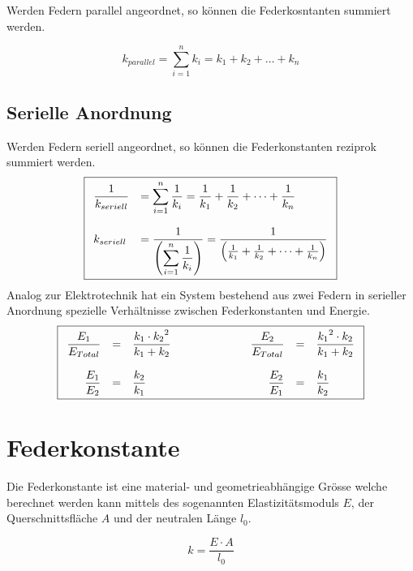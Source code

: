 \noindent
Werden Federn parallel angeordnet, so können die Federkosntanten summiert 
werden.

\[ \boxed{k_{parallel} 
	= \sum_{i=1}^n k_i 
	= k_1 + k_2 + \dots + k_n
} \]

\subsection{Serielle Anordnung}

\noindent
Werden Federn seriell angeordnet, so können die Federkonstanten reziprok 
summiert werden.
\[ \boxed{\begin{array}{l l}\displaystyle
	\frac{1}{k_{seriell}} 
		&= \displaystyle \sum_{i=1}^n \frac{1}{k_i} = 
		\displaystyle \frac{1}{k_1} + \frac{1}{k_2} 
			+ \dots + \frac{1}{k_n} \\
	& \\
	k_{seriell} 
		&= \displaystyle \frac{1}{\left( 
			\displaystyle \sum_{i=1}^n\frac{1}{k_i}\right)} 
		= \displaystyle \frac{1}{\left(
			\frac{1}{k_1} + \frac{1}{k_2} 
			+ \dots + \frac{1}{k_n} \right)}
\end{array}} \]
Analog zur Elektrotechnik hat ein System bestehend aus zwei Federn
in serieller Anordnung spezielle Verhältnisse zwischen Federkonstanten 
und Energie.
\[ \boxed{\begin{array}{r c l  r c l}
\displaystyle
\frac{E_1}{E_{Total}} 
	&=& \displaystyle \frac{k_1 \cdot {k_2}^2}{k_1 + k_2} 
	\qquad \qquad
	& \qquad \displaystyle \frac{E_2}{E_{Total}}
	&=& \displaystyle \frac{{k_1}^2 \cdot k_2}{k_1 + k_2} \\
 & & & & & \\
\displaystyle \frac{E_1}{E_2} 
	&=& \displaystyle \frac{k_2}{k_1} 
	\qquad \qquad
	& \qquad \displaystyle \frac{E_2}{E_1} 
	&=& 
	\displaystyle \frac{k_1}{k_2}
\end{array}} \]
\section{Federkonstante}
Die Federkonstante ist eine material- und geometrieabhängige Grösse welche
berechnet werden kann mittels des sogenannten Elastizitätsmoduls $E$, der
Querschnittsfläche $A$ und der neutralen Länge $l_0$.

\[ \boxed{k = \frac{E \cdot A}{l_0}} \]

